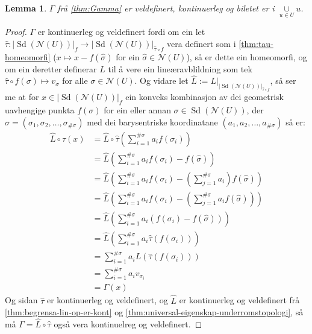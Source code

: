 \documentclass[a4paper, titlepage, 12pt, norsk]{article}
\theoremstyle{plain}
\newtheorem{lemma}[theorem]{Lemma}
\theoremstyle{definition}
\newcommand{\Nc}{\mathcal{N}}
\newcommand{\union}{ \mathop{\cup}\limits }
\newcommand{\gr}[1]{ \lvert #1 \rvert } %
\newcommand{\tuple}[1]{ \left( #1 \right) } %
\DeclareMathOperator{\Sd}{Sd}
\begin{document}
\begin{lemma} \label{thm:Gamma-eigenskapar} %
	\( \Gamma \) frå \autoref{thm:Gamma} er veldefinert, kontinuerleg og biletet er i \( \union_{u\in U} u \).
\end{lemma}

\begin{proof}

	\( \Gamma \) er kontinuerleg og veldefinert fordi om ein let \( \hat{\tau} : \gr{\Sd(\Nc(U))}_f \to \gr{\Sd(\Nc(U))}_{\hat{\tau} \circ f} \) vera definert som i \autoref{thm:tau-homeomorfi} (\( x \mapsto x - f(\hat{\sigma}) \) for ein \( \hat{\sigma} \in \Nc(U) \)), så er dette ein homeomorfi, og om ein deretter definerar \( L \) til å vere ein lineæravblildning som tek \( \hat{\tau} \circ f (\sigma) \mapsto v_{\sigma} \) for alle \( \sigma \in \Nc(U) \). Og vidare let \( \hat{L} := L|_{\gr{\Sd(\Nc(U))}_{\hat{\tau}\circ f}} \), så ser me at for \( x \in \gr{\Sd(\Nc(U))}_f \) ein konveks kombinasjon av dei geometrisk uavhengige punkta \( f(\sigma) \) for ein eller annan \( \sigma \in \Sd(\Nc(U)) \), der \( \sigma = \tuple{\sigma_1, \sigma_2, \dots, \sigma_{\#\sigma}} \) med dei barysentriske koordinatane \( \tuple{a_1, a_2, \dots, a_{\#\sigma}} \) så er:
	\begin{align*}
		\hat{L} \circ \hat{\tau} (x) &= \hat{L} \circ \hat{\tau} \tuple{\sum_{i=1}^{\#\sigma}a_i f(\sigma_i)} \\
		&= \hat{L} \tuple{\sum_{i=1}^{\#\sigma}a_i f(\sigma_i)-f(\hat{\sigma})} \\
		&= \hat{L} \tuple{\sum_{i=1}^{\#\sigma}a_i f(\sigma_i)-\tuple{\sum_{j=1}^{\#\sigma}a_i}f(\hat{\sigma})} \\
		&= \hat{L} \tuple{\sum_{i=1}^{\#\sigma}a_i f(\sigma_i)-\tuple{\sum_{j=1}^{\#\sigma}a_if(\hat{\sigma})}} \\
		&= \hat{L} \tuple{\sum_{i=1}^{\#\sigma}a_i\tuple{f(\sigma_i)-f(\hat{\sigma})}} \\
		&= \hat{L} \tuple{\sum_{i=1}^{\#\sigma}a_i\hat{\tau}\tuple{f(\sigma_i)}} \\
		&= \sum_{i=1}^{\#\sigma}a_iL\tuple{\hat{\tau}\tuple{f(\sigma_i)}} \\
		&= \sum_{i=1}^{\#\sigma}a_i v_{\sigma_i} \\
		&= \Gamma(x)
	\end{align*}
	Og sidan \( \hat{\tau} \) er kontinuerleg og veldefinert, og \( \hat{L} \) er kontinuerleg og veldefinert frå \autoref{thm:begrensa-lin-op-er-kont} og \autoref{thm:universal-eigenskap-underromstopologi}, så må \( \Gamma = \hat{L}\circ\hat{\tau} \) også vera kontinuelreg og veldefinert.


\end{proof}
\end{document}
